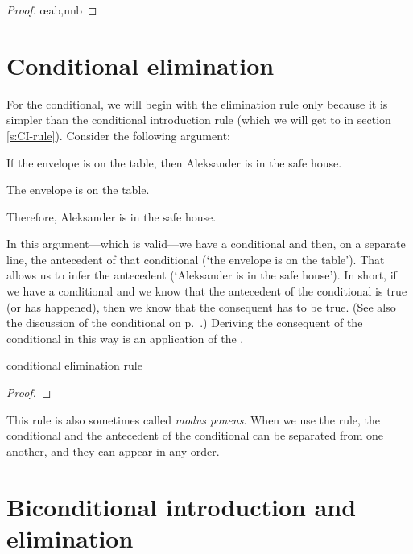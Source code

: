 \begin{proof}
	 \pr{}
	 \pr{}
	 
	 \oe{ab,nnb}
\end{proof}


\section{Conditional elimination}

For the conditional, we will begin with the elimination rule only because it is simpler than the conditional introduction rule (which we will get to in section \ref{s:CI-rule}). Consider the following argument:
	\begin{earg}
	\item	If the envelope is on the table, then Aleksander is in the safe house.
	\item The envelope is on the table.
	\item Therefore, Aleksander is in the safe house.
	\end{earg}
In this argument---which is valid---we have a conditional and then, on a separate line, the antecedent of that conditional (`the envelope is on the table'). That allows us to infer the antecedent (`Aleksander is in the safe house'). In short, if we have a conditional and we know that the antecedent of the conditional is true (or has happened), then we know that the consequent has to be true. (See also the discussion of the conditional on p.~\pageref{characteristic-tt-conditional}.) Deriving the consequent of the conditional in this way is an application of the .
\begin{factboxy}{conditional elimination rule}\label{ce-rule}
\begin{proof}
	 
\end{proof}
\end{factboxy}
This rule is also sometimes called \emph{modus ponens}. When we use the rule, the conditional and the antecedent of the conditional can be separated from one another, and they can appear in any order.


\section{Biconditional introduction and elimination} 

